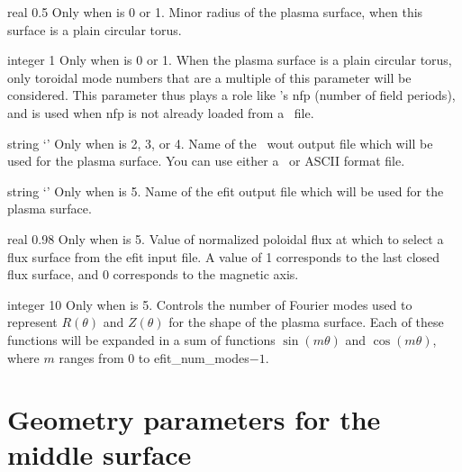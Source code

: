 \myhrule

{real}
{0.5}
{Only when  is 0 or 1.}
{Minor radius of the plasma surface, when this surface is a plain circular torus.}

\myhrule

{integer}
{1}
{Only when  is 0 or 1.}
{When the plasma surface is a plain circular torus, only toroidal mode numbers that are a multiple of this parameter will be considered.
This parameter thus plays a role like \vmec's {\ttfamily nfp} (number of field periods),
and is used when {\ttfamily nfp} is not already loaded from a \vmec~file.}

\myhrule

{string}
{`'}
{Only when  is 2, 3, or 4.}
{Name of the \vmec~{\ttfamily wout} output file which will be used for the plasma surface.
You can use either a \netCDF~or {\ttfamily ASCII} format file.}

\myhrule

{string}
{`'}
{Only when  is 5.}
{Name of the {\ttfamily efit} output file which will be used for the plasma surface.}

\myhrule

{real}
{0.98}
{Only when  is 5.}
{Value of normalized poloidal flux at which to select a flux surface from the {\ttfamily efit} input file.
A value of 1 corresponds to the last closed flux surface, and 0 corresponds to the magnetic axis.}

\myhrule

{integer}
{10}
{Only when  is 5.}
{Controls the number of Fourier modes used to represent $R(\theta)$ and $Z(\theta)$ for the shape of
the plasma surface. Each of these functions will be expanded in a sum of functions $\sin(m\theta)$ and $\cos(m\theta)$,
where $m$ ranges from 0 to {\ttfamily efit\_num\_modes}$-1$.}

\section{Geometry parameters for the middle surface}

